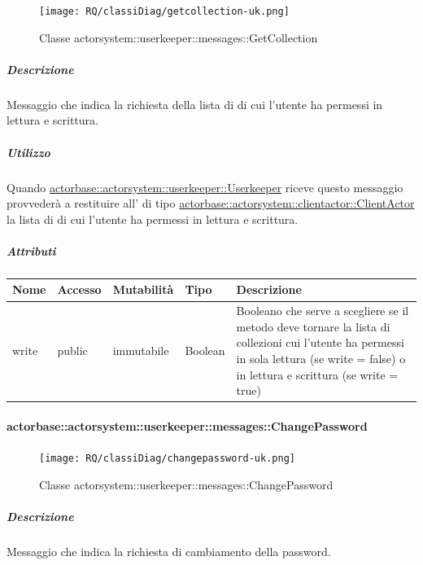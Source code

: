 \documentclass{scalatekids-article}
\begin{document}
\begin{figure}[H]
   \begin{center}
     \texttt{[image: RQ/classiDiag/getcollection-uk.png]}
     \caption{Classe actorsystem::userkeeper::messages::GetCollection}
   \end{center}
 \end{figure}

\subparagraph{Descrizione}
Messaggio che indica la richiesta della lista di  di cui
l'utente ha permessi in lettura e scrittura.

\subparagraph{Utilizzo}
Quando \hyperref[sec:actorbase::actorsystem::userkeeper::Userkeeper]{actorbase::\allowbreak{}actorsystem::\allowbreak{}userkeeper::\allowbreak{}Userkeeper}
riceve questo messaggio provvederà a restituire all' di tipo
\hyperref[sec:actorbase::actorsystem::clientactor::ClientActor]{actorbase::\allowbreak{}actorsystem::\allowbreak{}clientactor::\allowbreak{}ClientActor}
la lista di  di cui l'utente ha permessi in lettura
e scrittura.

\subparagraph{Attributi}
\begin{tabular}{| p{3cm} | p{1.5cm} | p{2cm} | p{2cm} | p{8.5cm} |}
  \hline
  Nome & Accesso & Mutabilità & Tipo & Descrizione\\
  \hline
  write & public & immutabile & Boolean & Booleano che serve a scegliere se il metodo deve tornare la lista di collezioni cui l'utente ha permessi in sola lettura (se write = false) o in lettura e scrittura (se write = true) \\
  \hline
\end{tabular}


\paragraph{actorbase::actorsystem::userkeeper::messages::ChangePassword}
\label{sec:actorbase::actorsystem::userkeeper::messages::ChangePassword}

\begin{figure}[H]
   \begin{center}
     \texttt{[image: RQ/classiDiag/changepassword-uk.png]}
     \caption{Classe actorsystem::userkeeper::messages::ChangePassword}
   \end{center}
 \end{figure}

\subparagraph{Descrizione}
Messaggio che indica la richiesta di cambiamento della password.
\end{document}
